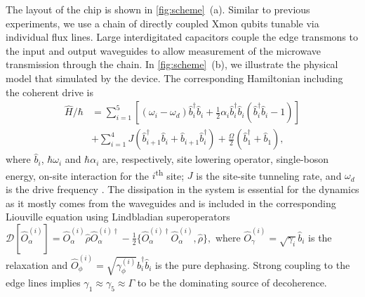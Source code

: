 \documentclass[%
 aps, prl,
 amsmath,amssymb,
 reprint,%
superscriptaddress
]{revtex4-2}
\begin{document}
The layout of the chip is shown in \autoref{fig:scheme}~(a). Similar to previous experiments, we use a chain of directly coupled Xmon qubits tunable via individual flux lines. Large interdigitated capacitors couple the edge transmons to the input and output waveguides to allow measurement of the microwave transmission through the chain. In \autoref{fig:scheme}~(b), we illustrate the physical model that simulated by the device. The corresponding Hamiltonian including the coherent drive is
\begin{equation}
\begin{aligned}
\hat H/\hbar &= \sum_{i=1}^5\left[ (\omega_i - \omega_d) \hat b^\dag_i \hat b_i + \frac{1}{2} \alpha_i \hat b_i^\dag \hat b_i (\hat b^\dag_i \hat b_i - 1)\right]\\
&+\sum_{i=1}^4 J (\hat b^\dag_{i+1} \hat b_i + \hat b_{i+1} \hat b_i^\dag)+\frac{\Omega}{2}(\hat b_1^\dag + \hat b_1),
\end{aligned}\label{eq:bose-hubbard}
\end{equation} 
where $\hat b_i$, $\hbar \omega_i$ and $\hbar\alpha_i$ are, respectively, site lowering operator, single-boson energy, on-site interaction for the $i$\textsuperscript{th} site; $J$ is the site-site tunneling rate, and $\omega_d$ is the drive frequency \cite{egorova2020analog, PhysRevA.102.013707, yanay2020two}. The dissipation in the system is essential for the dynamics as it mostly comes from the waveguides and is included in the corresponding Liouville equation using Lindbladian superoperators $\mathcal D[\hat{O}^{(i)}_\alpha] = \hat{O}^{(i)}_\alpha \hat \rho \hat{O}^{(i)\dag}_\alpha - \frac{1}{2}\{\hat{O}^{(i)\dag}_\alpha \hat{O}^{(i)}_\alpha, \hat \rho\},$ where $\hat{O}^{(i)}_\gamma = \sqrt{\gamma_i} \hat b_i$ is the relaxation and $\hat{O}^{(i)}_\phi = \sqrt{\gamma^{(i)}_\phi} \hat b_i^\dag \hat b_i$ is the pure dephasing. Strong coupling to the edge lines implies $\gamma_1 \approx \gamma_5 \approx \Gamma$ to be the dominating source of decoherence.
\end{document}

